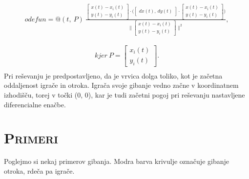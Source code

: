 \documentclass[a4paper,12pt]{article}
\begin{document}
\begin{align*}
    odefun = @(t,\ P) 
    \
    \frac{
        \begin{bmatrix} 
            x(t) - x_i(t) \\
            y(t) - y_i(t)
        \end{bmatrix}
        \cdot
        \Big(
        \begin{bmatrix} 
            dx(t), \ %
            dy(t)
        \end{bmatrix}
        \cdot
        \begin{bmatrix} 
            x(t) - x_i(t) \\
            y(t) - y_i(t)
        \end{bmatrix}
        \Big)
        }
        {
        \Big \|
        \begin{bmatrix} 
            x(t) - x_i(t) \\
            y(t) - y_i(t)
        \end{bmatrix}
        \Big \| ^ {2}
        },
\end{align*}

\begin{align*}
    kjer \ P = 
        \begin{bmatrix} 
            x_i(t) \\
            y_i(t)
        \end{bmatrix}
    .
    \\
\end{align*}
Pri reševanju je predpostavljeno, da je vrvica dolga toliko, kot je začetna oddaljenost igrače in otroka. 
Igrača svoje gibanje vedno začne v koordinatnem izhodišču, torej v točki (0, 0), kar je tudi začetni pogoj pri reševanju nastavljene diferencialne enačbe.


\section{\textsc{\large{Primeri}}}

Poglejmo si nekaj primerov gibanja. Modra barva krivulje označuje gibanje otroka, rdeča pa igrače.
\end{document}
